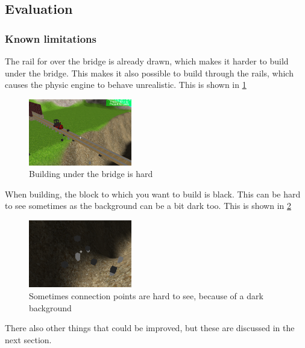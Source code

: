 \subsection{Evaluation}
\subsubsection{Known limitations}
The rail for over the bridge is already drawn, which makes it harder to build under the bridge. This makes it also possible to build through the rails, which causes the physic engine to behave unrealistic. This is shown in \ref{fig:limit1}
\begin{figure}[H]
    \centering
    \includegraphics[width=0.4\textwidth]{screenshots/limit1.png}
    \caption{Building under the bridge is hard}
    \label{fig:limit1}
\end{figure}
When building, the block to which you want to build is black. This can be hard to see sometimes as the background can be a bit dark too. This is shown in \ref{fig:limit2}
\begin{figure}[H]
    \centering
    \includegraphics[width=0.4\textwidth]{screenshots/limi2.png}
    \caption{Sometimes connection points are hard to see, because of a dark background}
    \label{fig:limit2}
\end{figure}
There also other things that could be improved, but these are discussed in the next section.